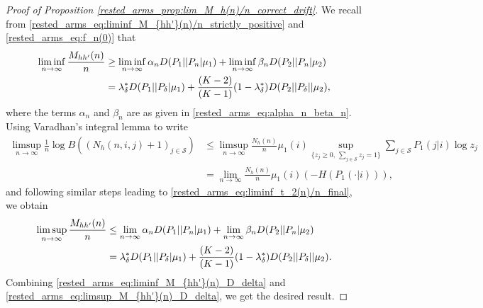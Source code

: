 \begin{proof}[Proof of Proposition \ref{rested_arms_prop:lim_M_h(n)/n_correct_drift}]
We recall from \eqref{rested_arms_eq:liminf_M_{hh'}(n)/n_strictly_positive} and \eqref{rested_arms_eq:f_n(0)} that
\begingroup\allowdisplaybreaks\begin{align}
	\liminf_{n\to\infty}\frac{M_{hh'}(n)}{n}
	&\geq \liminf\limits_{n\to\infty}\alpha_n D(P_1||P_n|\mu_1)+\liminf\limits_{n\to\infty}\beta_n D(P_2||P_n|\mu_2)\nonumber\\
	&=\lambda_\delta^*D(P_1||P_\delta|\mu_1)
	+\frac{(K-2)}{(K-1)}(1-\lambda_\delta^*)D(P_2||P_\delta||\mu_2),\label{rested_arms_eq:liminf_M_{hh'}(n)_D_delta}
\end{align}\endgroup
where the terms $\alpha_n$ and $\beta_n$ are as given in \eqref{rested_arms_eq:alpha_n_beta_n}.
Using Varadhan's integral lemma \cite[Theorem 4.3.1]{AmirDembo2009} to write
\begingroup\allowdisplaybreaks\begin{align}
    	\limsup\limits_{n\to\infty}\frac{1}{n}\log B((N_h(n,i,j)+1)_{j\in\mathcal{S}})
    	&\leq \limsup\limits_{n\to\infty}\frac{N_h(n)}{n}\mu_1(i)\sup\limits_{\{z_j\geq 0,\,\sum\limits_{j\in\mathcal{S}}z_j=1\}}\sum\limits_{j\in\mathcal{S}}P_1(j|i)\log z_j\nonumber\\
    	&=\lim\limits_{n\to\infty}\frac{N_h(n)}{n}\mu_1(i)(-H(P_1(\cdot|i))),\label{rested_arms_eq:limsup_t_2(n)/n_3}
    \end{align}\endgroup
    and following similar steps leading to \eqref{rested_arms_eq:liminf_t_2(n)/n_final}, we obtain
    \begingroup\allowdisplaybreaks\begin{align}
    \limsup_{n\to\infty}\frac{M_{hh'}(n)}{n}
	&\leq \lim\limits_{n\to\infty}\alpha_n D(P_1||P_n|\mu_1)+\lim\limits_{n\to\infty}\beta_n D(P_2||P_n|\mu_2)\nonumber\\
	&=\lambda_\delta^*D(P_1||P_\delta|\mu_1)
	+\frac{(K-2)}{(K-1)}(1-\lambda_\delta^*)D(P_2||P_\delta||\mu_2).\label{rested_arms_eq:limsup_M_{hh'}(n)_D_delta}
    \end{align}\endgroup
Combining \eqref{rested_arms_eq:liminf_M_{hh'}(n)_D_delta} and \eqref{rested_arms_eq:limsup_M_{hh'}(n)_D_delta}, we get the desired result.
\end{proof}

